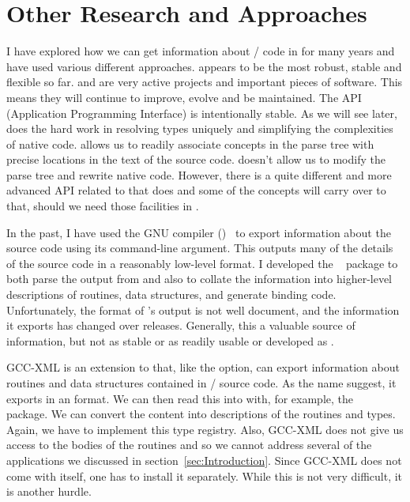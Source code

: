 \section{Other Research and Approaches}

I have explored how we can get information about \C/\Cpp{} code in
\R{} for many years and have used various different approaches.
\libclang{} appears to be the most robust, stable and flexible so far.
\clang{} and \libclang{} are very active projects and important pieces
of software. This means they will continue to improve, evolve and be
maintained.  The API (Application Programming Interface) is
intentionally stable.  As we will see later, \libclang{} does the hard
work in resolving types uniquely and simplifying the complexities of
native code.  \libclang{} allows us to readily associate concepts in
the parse tree with precise locations in the text of the source
code. \libclang{} doesn't allow us to modify the parse tree and
rewrite native code. However, there is a quite different and more
advanced API related to \libclang{} that does and some of the concepts
will carry over to that, should we need those facilities in \R.

In the past, I have used the GNU compiler (\gcc)~\cite{bib:GCC} to
export information about the source code using its
 command-line argument.  This outputs
many of the details of the source code in a reasonably low-level
format. I developed the ~\cite{bib:RGCCTU}
package to both parse the output from \gcc{} and also to collate the
information into higher-level descriptions of routines, data
structures, and generate binding code.  Unfortunately, the format of
\gcc's output is not well document, and the information it exports has
changed over releases.  Generally, this a valuable source of
information, but not as stable or as readily usable or developed as
\libclang.

GCC-XML is an extension to \gcc{} that, like the
 option, can export information about
routines and data structures contained in \C/\Cpp{} source code.  As
the name suggest, it exports in an \XML{} format.  We can then read
this into \R{} with, for example, the ~\cite{bib:RSXML}
package.  We can convert the \XML{} content into descriptions of the
routines and types.  Again, we have to implement this type registry.
Also, GCC-XML does not give us access to the bodies of the routines
and so we cannot address several of the applications we discussed in
section~\ref{sec:Introduction}.  Since GCC-XML does not come with
\gcc{} itself, one has to install it separately.  While this is not
very difficult, it is another hurdle.


